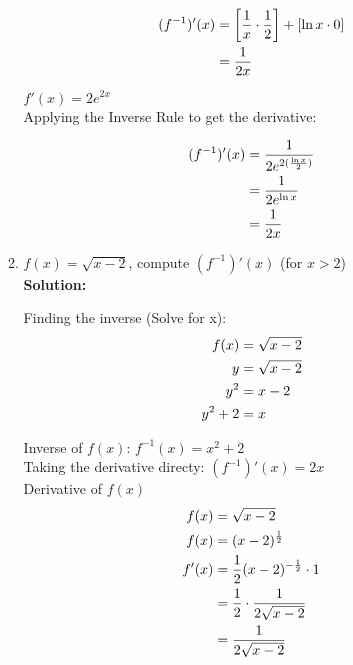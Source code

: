 \documentclass[a4paper]{article}
\begin{document}
\begin{enumerate}
\begin{enumerate}
\begin{align*}
 (f^{-1})'(x) &= \left[ \frac{1}{x} \cdot \frac{1}{2}\right] + \left[ \ln x \cdot 0 \right]\notag\\
 &= \frac{1}{2x}\notag
\end{align*}




$f'(x) = 2e^{2x}$\\	

Applying the Inverse Rule to get the derivative:

\begin{align}
	(f^{-1})'(x) &= \frac{1}{2e^{2(\frac{\ln x}{2})}}\notag\\
	&= \frac{1}{2e^{\ln x}}\notag\\
	&= \frac{1}{2x}\notag
\end{align}
	
	
	\item $f(x) = \sqrt{x - 2}$, compute $(f^{-1})'(x)$ (for $x > 2$)\\
	\textbf{Solution:}\\
	
	
	
Finding the inverse (Solve for x):\\

\begin{align*}
	f(x) &= \sqrt{x - 2}\notag\\
	y &= \sqrt{x - 2}\notag\\
	y^2 &= x - 2\notag\\
	y^2 + 2 &= x\notag
\end{align*}		

Inverse of $f(x)$: $f^{-1}(x) = x^2 + 2$\\
Taking the derivative directy: $(f^{-1})'(x) = 2x$\\

Derivative of $f(x)$\\	
	
\begin{align*}
	f(x) &= \sqrt{x - 2}\notag\\
	f(x) &= (x-2)^\frac{1}{2}\notag\\
	f'(x) &= \frac{1}{2}(x-2)^{-\frac{1}{2}} \cdot 1\notag\\
	&= \frac{1}{2} \cdot \frac{1}{2 \sqrt{x-2}}\notag\\
	&= \frac{1}{2\sqrt{x-2}}\notag
\end{align*}	
	

\end{enumerate}
\end{enumerate}
\end{document}
